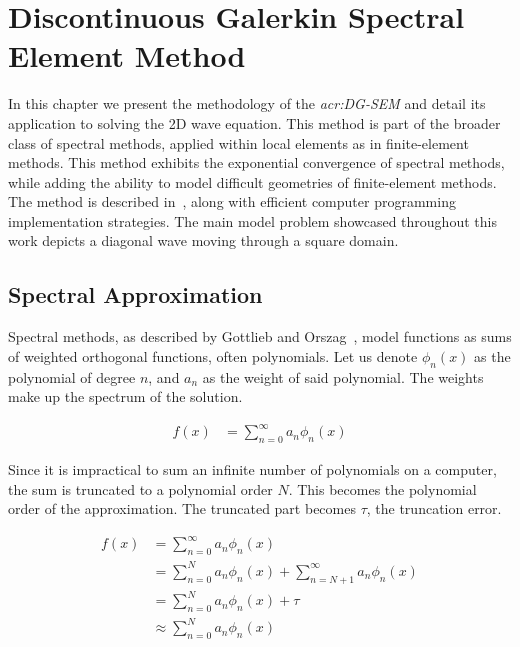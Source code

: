 \chapter{Discontinuous Galerkin Spectral Element Method}\label{chapter:spectral_element_method}

In this chapter we present the methodology of the \textit{\acrfull{acr:DG-SEM}} and detail its
application to solving the 2D wave equation. This method is part of the broader class of spectral
methods, applied within local elements as in finite-element methods. This method exhibits the
exponential convergence of spectral methods, while adding the ability to model difficult geometries
of finite-element methods. The method is described in~\cite{Kopriva2009}, along with efficient
computer programming implementation strategies. The main model problem showcased throughout this
work depicts a diagonal wave moving through a square domain.

\section{Spectral Approximation}\label{section:spectral_element_method:spectral_approximation}

Spectral methods, as described by Gottlieb and Orszag~\cite{Gottlieb1977}, model functions as sums
of weighted orthogonal functions, often polynomials. Let us denote \(\phi_n(x)\) as the polynomial
of degree \(n\), and \(a_n\) as the weight of said polynomial. The weights make up the spectrum of
the solution.

\begin{equation} \label{equ:infinite_sum}
    \begin{split}
        f(x) & = \sum_{n = 0}^{\infty }a_n \phi_n(x)
    \end{split}
\end{equation}

Since it is impractical to sum an infinite number of polynomials on a computer, the sum is truncated
to a polynomial order \(N\). This becomes the polynomial order of the approximation. The truncated
part becomes \(\tau \), the truncation error.

\begin{equation} \label{equ:truncated_sum}
    \begin{split}
        f(x) & = \sum_{n = 0}^{\infty }a_n \phi_n(x) \\
        & = \sum_{n = 0}^{N}a_n \phi_n(x) + \sum_{n = N + 1}^{\infty }a_n \phi_n(x) \\
        & = \sum_{n = 0}^{N}a_n \phi_n(x) + \tau \\
        & \approx \sum_{n = 0}^{N}a_n \phi_n(x)
    \end{split}
\end{equation}

